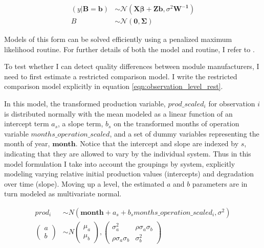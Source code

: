 \documentclass[a4paper]{article}
\begin{document}
\begin{align}
(y|\mathbf{B=b}) &\sim \mathcal{N}(\mathbf{X\beta + Zb}, \sigma^2\mathbf{W^{-1}})\\
B &\sim \mathcal{N}(\mathbf{0,\Sigma})
\label{equation:lme_simple}
\end{align}

Models of this form can be solved efficiently using a penalized maximum likelihood routine. For further details of both the model and routine, I refer to \citet{bates_fitting_2015}.

To test whether I can detect quality differences between module manufacturers, I need to first estimate a restricted comparison model. I write the restricted comparison model explicitly in equation \ref{eqn:observation_level_rest}.

In this model, the transformed production variable, $prod\_scaled_{i}$ for observation $i$ is distributed normally with the mean modeled as a linear function of an intercept term $a_s$, a slope term, $b_s$ on the transformed months of operation variable $months\_operation\_scaled$, and a set of dummy variables representing the month of year, $\mathbf{month}$. Notice that the intercept and slope are indexed by $s$, indicating that they are allowed to vary by the individual system. Thus in this model formulation I take into account the groupings by system, explicitly modeling varying relative initial production values (intercepts) and degradation over time (slope). Moving up a level, the estimated $a$ and $b$ parameters are in turn modeled as multivariate normal.

\begin{equation}
\begin{aligned}
prod_{i} &\sim N(\mathbf{month} + a_s + b_s months\_operation\_scaled_{i}, \sigma^2)\\
\begin{pmatrix}
  a\\
  b
\end{pmatrix}
&\sim N
\begin{pmatrix}
  \mu_a\\
  \mu_b
\end{pmatrix},
\begin{pmatrix}
  \sigma_a^2 & \rho \sigma_a \sigma_b \\
  \rho \sigma_a \sigma_b & \sigma_b^2
\end{pmatrix}\label{eqn:observation_level_rest}
\end{aligned}
\end{equation}
\end{document}
